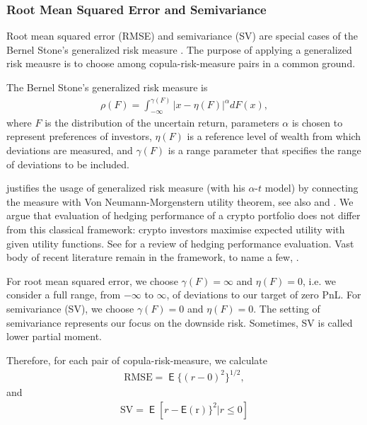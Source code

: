 \subsubsection{Root Mean Squared Error and Semivariance}
Root mean squared error (RMSE) and semivariance (SV) are special cases of the Bernel Stone's generalized risk measure \citep{stone1973general}.
The purpose of applying a generalized risk meausre is to choose among copula-risk-measure pairs in a common ground. \medskip

The Bernel Stone's generalized risk measure is
\begin{align*}
    \rho(F) = \int_{-\infty}^{\gamma(F)} \left|x-\eta(F)\right|^\alpha dF(x),
    \end{align*}
where $F$ is the distribution of the uncertain return, parameters $\alpha$ is chosen to represent preferences of investors,
$\eta(F)$ is a reference level of wealth from which deviations are measured, and $\gamma(F)$ is a range parameter that specifies the range of deviations to be included.\medskip

\citet{fishburn1977mean} justifies the usage of generalized risk measure (with his $\alpha$-$t$ model) by connecting the measure with Von Neumann-Morgenstern utility theorem, see also \citet{bawa1975optimal, bawa1978safety}
and \citet{morgenstern1953theory}.
We argue that evaluation of hedging performance of a crypto portfolio does not differ from this classical framework:
crypto investors maximise expected utility with given utility functions.
See \citet{chen2003futures} for a review of hedging performance evaluation.
Vast body of recent literature remain in the framework, to name a few, \citet{sebastiao2020bitcoin, deng2020minimum, cui2020composite, oglend2020futures}. \medskip

For root mean squared error, we choose $\gamma(F)=\infty$ and $\eta(F)=0$, i.e. we consider a full range, from $-\infty$ to $\infty$, of deviations to our target
of zero PnL.
For semivariance (SV), we choose $\gamma(F)=0$ and $\eta(F)=0$.
The setting of semivariance represents our focus on the downside risk.
Sometimes, SV is called lower partial moment. \medskip

Therefore, for each pair of copula-risk-measure, we calculate
\begin{align*}
    \text{RMSE} = \operatorname{\mathsf{E}}\{(r-0)^2\}^{1/2},
    \end{align*}
and
\begin{align*}
    \text{SV} = \operatorname{\mathsf{E}}\left[r - \operatorname{\mathsf{E}(r)}\}^2 | r \leq 0 \right]
\end{align*}

